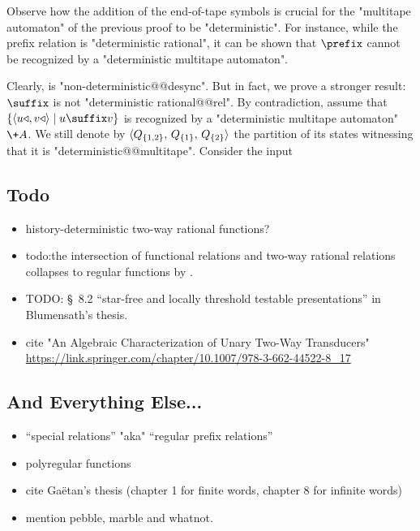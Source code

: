 Observe how the addition of the end-of-tape symbols is crucial for the "multitape automaton"
of the previous proof to be "deterministic". For instance, while
the prefix relation is "deterministic rational", it can be shown that
$\prefix$ cannot be recognized by a "deterministic multitape automaton".

Clearly,  is "non-deterministic@@desync". But in fact, we prove a stronger result: $\suffix$ is not "deterministic rational@@rel".
By contradiction, assume that $\{\tup{u\triangleleft,v\triangleleft} \mid u \suffix v\}$
is recognized by a "deterministic multitape automaton" $\+A$.
We still denote by $\langle Q_{\{1,2\}},\,Q_{\{1\}},\,Q_{\{2\}}\rangle$ the partition of its states 
witnessing that it is "deterministic@@multitape".
Consider the input 

\subsection{Todo}

\begin{itemize}
	\item history-deterministic two-way rational functions?
	\item todo:the intersection of
	functional relations and two-way rational relations
	collapses to regular functions by
	\cite[Theorem 22, p.~243]{EH2001transduction}.
	\item TODO: \S~8.2 ``star-free and locally threshold testable presentations''
		in Blumensath's thesis.
	\item cite "An Algebraic Characterization of Unary Two-Way Transducers"
	\url{https://link.springer.com/chapter/10.1007/978-3-662-44522-8\_17}
\end{itemize}

\subsection{And Everything Else...}

\begin{itemize}
	\item ``special relations'' "aka" ``regular prefix relations'' \cite{Choffrut2006Survey}
	\item polyregular functions
	\item cite Gaëtan's thesis (chapter 1 for finite words, chapter 8 for infinite words)
	\item mention pebble, marble and whatnot.
\end{itemize}